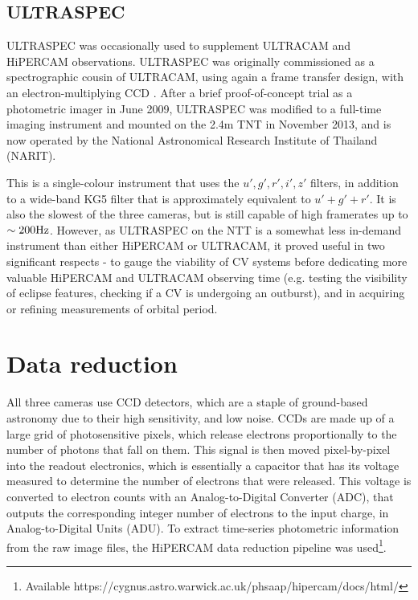 \subsection{ULTRASPEC}
\label{sect:observations:ultraspec}

ULTRASPEC was occasionally used to supplement ULTRACAM and HiPERCAM observations. ULTRASPEC was originally commissioned as a spectrographic cousin of ULTRACAM, using again a frame transfer design, with an electron-multiplying CCD \citep{dhillon2014}.
After a brief proof-of-concept trial as a photometric imager in June 2009, ULTRASPEC was modified to a full-time imaging instrument and mounted on the 2.4m TNT in November 2013, and is now operated by the National Astronomical Research Institute of Thailand (NARIT).

This is a single-colour instrument that uses the $u',g',r',i',z'$ filters, in addition to a wide-band KG5 filter that is approximately equivalent to $u' + g' + r'$. It is also the slowest of the three cameras, but is still capable of high framerates up to $\sim 200 \rm Hz$. However, as ULTRASPEC on the NTT is a somewhat less in-demand instrument than either HiPERCAM or ULTRACAM, it proved useful in two significant respects - to gauge the viability of CV systems before dedicating more valuable HiPERCAM and ULTRACAM observing time (e.g. testing the visibility of eclipse features, checking if a CV is undergoing an outburst), and in acquiring or refining measurements of orbital period.


\section{Data reduction}
\label{sect:observations:data reduction}

All three cameras use CCD detectors, which are a staple of ground-based astronomy due to their high sensitivity, and low noise.
CCDs are made up of a large grid of photosensitive pixels, which release electrons proportionally to the number of photons that fall on them. This signal is then moved pixel-by-pixel into the readout electronics, which is essentially a capacitor that has its voltage measured to determine the number of electrons that were released. This voltage is converted to electron counts with an Analog-to-Digital Converter (ADC), that outputs the corresponding integer number of electrons to the input charge, in Analog-to-Digital Units (ADU).
To extract time-series photometric information from the raw image files, the HiPERCAM data reduction pipeline was used\footnote{Available https://cygnus.astro.warwick.ac.uk/phsaap/hipercam/docs/html/}.

